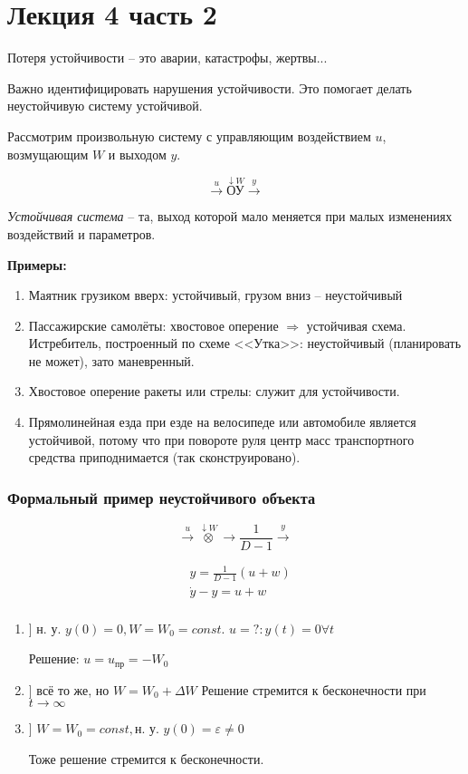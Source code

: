 \documentclass[main.tex]{subfiles}
\begin{document}
\section{Лекция 4 часть 2}

Потеря устойчивости -- это аварии, катастрофы, жертвы...

Важно идентифицировать нарушения устойчивости.
Это помогает делать неустойчивую систему устойчивой.

Рассмотрим произвольную систему с управляющим воздействием $u$, возмущающим $W$ и выходом $y$.

$$ \xrightarrow{u} \overset{\downarrow W}{\boxed{\text{ОУ}}} \xrightarrow{y} $$

\emph{Устойчивая система} -- та, выход которой мало меняется при малых изменениях воздействий и параметров.

\textbf{Примеры:}
\begin{enumerate}
    \item Маятник грузиком вверх: устойчивый, грузом вниз -- неустойчивый
    \item Пассажирские самолёты: хвостовое оперение $ \Rightarrow $ устойчивая схема.
    Истребитель, построенный по схеме <<Утка>>: неустойчивый (планировать не может), зато маневренный.
    \item Хвостовое оперение ракеты или стрелы: служит для устойчивости.
    \item Прямолинейная езда при езде на велосипеде или автомобиле является устойчивой, потому что при повороте руля центр масс транспортного средства приподнимается (так сконструировано).
\end{enumerate}

\subsubsection{Формальный пример неустойчивого объекта}

$$ \xrightarrow{u} \overset{\downarrow W}{\otimes} \rightarrow \boxed{\frac{1}{D-1}} \xrightarrow{y} $$

\begin{align*}
    & y = \frac{1}{D-1}(u+w) \\
    & \dot y - y = u + w \\
\end{align*}

\begin{enumerate}
    \item ] н. у. $y(0)=0, W=W_0=const$.
    $u=? : y(t)=0 \forall t$

    Решение: $ u = u_{\text{пр}} = - W_0 $

    \item ] всё то же, но $ W = W_0 + \Delta W $
    Решение стремится к бесконечности при $t \to \infty $

    \item ] $ W = W_0 = const, \text{н. у. } y(0) = \varepsilon \ne 0 $

    Тоже решение стремится к бесконечности.
\end{enumerate}
\end{document}
